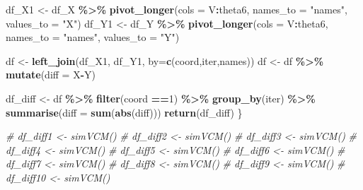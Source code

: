 \documentclass[
]{article}
\newenvironment{Shaded}{\begin{snugshade}}{\end{snugshade}}
\newcommand{\AttributeTok}[1]{\textcolor[rgb]{0.13,0.29,0.53}{#1}}
\newcommand{\CommentTok}[1]{\textcolor[rgb]{0.56,0.35,0.01}{\textit{#1}}}
\newcommand{\DecValTok}[1]{\textcolor[rgb]{0.00,0.00,0.81}{#1}}
\newcommand{\FunctionTok}[1]{\textcolor[rgb]{0.13,0.29,0.53}{\textbf{#1}}}
\newcommand{\NormalTok}[1]{#1}
\newcommand{\OtherTok}[1]{\textcolor[rgb]{0.56,0.35,0.01}{#1}}
\newcommand{\SpecialCharTok}[1]{\textcolor[rgb]{0.81,0.36,0.00}{\textbf{#1}}}
\newcommand{\StringTok}[1]{\textcolor[rgb]{0.31,0.60,0.02}{#1}}
\begin{document}
\begin{Shaded}
\begin{Highlighting}[]
\NormalTok{  df\_X1 }\OtherTok{\textless{}{-}}\NormalTok{ df\_X }\SpecialCharTok{\%\textgreater{}\%} \FunctionTok{pivot\_longer}\NormalTok{(}\AttributeTok{cols =}\NormalTok{ V}\SpecialCharTok{:}\NormalTok{theta6, }\AttributeTok{names\_to =} \StringTok{"names"}\NormalTok{, }\AttributeTok{values\_to =} \StringTok{"X"}\NormalTok{)}
\NormalTok{  df\_Y1 }\OtherTok{\textless{}{-}}\NormalTok{ df\_Y }\SpecialCharTok{\%\textgreater{}\%} \FunctionTok{pivot\_longer}\NormalTok{(}\AttributeTok{cols =}\NormalTok{ V}\SpecialCharTok{:}\NormalTok{theta6, }\AttributeTok{names\_to =} \StringTok{"names"}\NormalTok{, }\AttributeTok{values\_to =} \StringTok{"Y"}\NormalTok{)}
  
\NormalTok{  df }\OtherTok{\textless{}{-}} \FunctionTok{left\_join}\NormalTok{(df\_X1, df\_Y1, }\AttributeTok{by=}\FunctionTok{c}\NormalTok{(}\StringTok{\textquotesingle{}coord\textquotesingle{}}\NormalTok{,}\StringTok{\textquotesingle{}iter\textquotesingle{}}\NormalTok{,}\StringTok{\textquotesingle{}names\textquotesingle{}}\NormalTok{))}
\NormalTok{  df }\OtherTok{\textless{}{-}}\NormalTok{ df }\SpecialCharTok{\%\textgreater{}\%} \FunctionTok{mutate}\NormalTok{(}\AttributeTok{diff =}\NormalTok{ X}\SpecialCharTok{{-}}\NormalTok{Y)}
  
\NormalTok{  df\_diff }\OtherTok{\textless{}{-}}\NormalTok{ df }\SpecialCharTok{\%\textgreater{}\%}
    \FunctionTok{filter}\NormalTok{(coord }\SpecialCharTok{==}\DecValTok{1}\NormalTok{) }\SpecialCharTok{\%\textgreater{}\%}
    \FunctionTok{group\_by}\NormalTok{(iter) }\SpecialCharTok{\%\textgreater{}\%}
    \FunctionTok{summarise}\NormalTok{(}\AttributeTok{diff =} \FunctionTok{sum}\NormalTok{(}\FunctionTok{abs}\NormalTok{(diff)))}
  \FunctionTok{return}\NormalTok{(df\_diff)}
\NormalTok{\}}
\end{Highlighting}
\end{Shaded}

\begin{Shaded}
\begin{Highlighting}[]
\CommentTok{\# df\_diff1 \textless{}{-} simVCM()}
\CommentTok{\# df\_diff2 \textless{}{-} simVCM()}
\CommentTok{\# df\_diff3 \textless{}{-} simVCM()}
\CommentTok{\# df\_diff4 \textless{}{-} simVCM()}
\CommentTok{\# df\_diff5 \textless{}{-} simVCM()}
\CommentTok{\# df\_diff6 \textless{}{-} simVCM()}
\CommentTok{\# df\_diff7 \textless{}{-} simVCM()}
\CommentTok{\# df\_diff8 \textless{}{-} simVCM()}
\CommentTok{\# df\_diff9 \textless{}{-} simVCM()}
\CommentTok{\# df\_diff10 \textless{}{-} simVCM()}
\end{Highlighting}
\end{Shaded}
\end{document}
